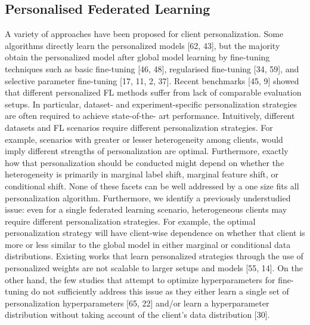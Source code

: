 \documentclass[withindex,glossary,firstyr]{cam-thesis}
\begin{document}
\subsection{Personalised Federated Learning}
A variety of approaches have been proposed for client personalization. Some algorithms directly learn the personalized models [62, 43], but the majority obtain the personalized model after global model learning by fine-tuning techniques such as basic fine-tuning [46, 48], regularised fine-tuning [34, 59], and selective parameter fine-tuning [17, 11, 2, 37]. Recent benchmarks [45, 9] showed that different personalized FL methods suffer from lack of comparable evaluation setups. In particular, dataset- and experiment-specific personalization strategies are often required to achieve state-of-the- art performance. Intuitively, different datasets and FL scenarios require different personalization strategies. For example, scenarios with greater or lesser heterogeneity among clients, would imply different strengths of personalization are optimal. Furthermore, exactly how that personalization should be conducted might depend on whether the heterogeneity is primarily in marginal label shift, marginal feature shift, or conditional shift. None of these facets can be well addressed by a one size fits all personalization algorithm. Furthermore, we identify a previously understudied issue: even for a single federated learning scenario, heterogeneous clients may require different personalization strategies. For example, the optimal personalization strategy will have client-wise dependence on whether that client is more or less similar to the global model in either marginal or conditional data distributions. Existing works that learn personalized strategies through the use of personalized weights are not scalable to larger setups and models [55, 14]. On the other hand, the few studies that attempt to optimize hyperparameters for fine-tuning do not sufficiently address this issue as they either learn a single set of personalization hyperparameters [65, 22] and/or learn a hyperparameter distribution without taking account of the client’s data distribution [30].
\end{document}
